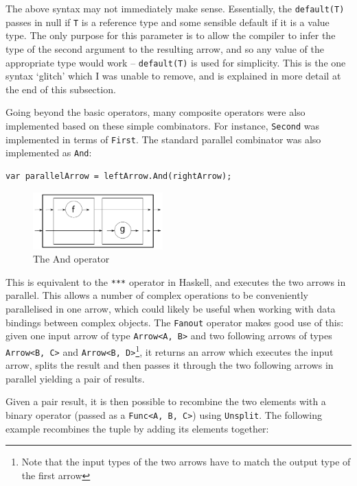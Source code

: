 \documentclass[12pt,twoside,notitlepage]{report}
\begin{document}
The above syntax may not immediately make sense. Essentially, the \texttt{default(T)} passes in null if \texttt{T} is a reference type and some sensible default if it is a value type. The only purpose for this parameter is to allow the compiler to infer the type of the second argument to the resulting arrow, and so any value of the appropriate type would work -- \texttt{default(T)} is used for simplicity. This is the one syntax `glitch' which I was unable to remove, and is explained in more detail at the end of this subsection.

Going beyond the basic operators, many composite operators were also implemented based on these simple combinators. For instance, \texttt{Second} was implemented in terms of \texttt{First}. The standard parallel combinator was also implemented as \texttt{And}:

\begin{lstlisting}[language={[Sharp]C}]
var parallelArrow = leftArrow.And(rightArrow);
\end{lstlisting}

\begin{figure}[!ht]
  \centering
  \includegraphics[width=50mm]{fig/AndOperator.pdf}
  \caption{The And operator}
  \label{fig:and_operator}
\end{figure}

This is equivalent to the \texttt{***} operator in Haskell, and executes the two arrows in parallel. This allows a number of complex operations to be conveniently parallelised in one arrow, which could likely be useful when working with data bindings between complex objects. The \texttt{Fanout} operator makes good use of this: given one input arrow of type \texttt{Arrow<A, B>} and two following arrows of types \texttt{Arrow<B, C>} and \texttt{Arrow<B, D>}\footnote{Note that the input types of the two arrows have to match the output type of the first arrow}, it returns an arrow which executes the input arrow, splits the result and then passes it through the two following arrows in parallel yielding a pair of results.

Given a pair result, it is then possible to recombine the two elements with a binary operator (passed as a \texttt{Func<A, B, C>}) using \texttt{Unsplit}. The following example recombines the tuple by adding its elements together:
\end{document}
